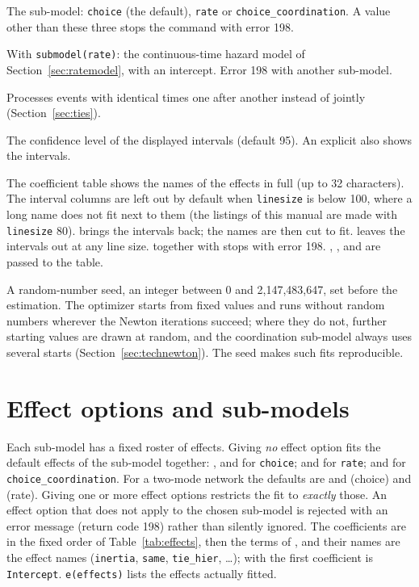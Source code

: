 \begin{description}[style=nextline,nosep]
  \item[\opt{submodel(string)}] The sub-model: \texttt{choice} (the default), \texttt{rate} or \texttt{choice\_coordination}. A value other than these three stops the command with error 198.
  \item[\opt{intercept}] With \texttt{submodel(rate)}: the continuous-time hazard model of Section~\ref{sec:ratemodel}, with an intercept. Error 198 with another sub-model.
  \item[\opt{sequential}] Processes events with identical times one after another instead of jointly (Section~\ref{sec:ties}).
  \item[\opt{level(\#)}] The confidence level of the displayed intervals (default 95). An explicit  also shows the intervals.
  \item[\opt{ci}, \opt{noci}] The coefficient table shows the names of the effects in full (up to 32 characters). The interval columns are left out by default when \texttt{linesize} is below 100, where a long name does not fit next to them (the listings of this manual are made with \texttt{linesize} 80).  brings the intervals back; the names are then cut to fit.  leaves the intervals out at any line size.  together with  stops with error 198. , ,  and  are passed to the table.
  \item[\opt{seed(\#)}] A random-number seed, an integer between 0 and 2{,}147{,}483{,}647, set before the estimation. The optimizer starts from fixed values and runs without random numbers wherever the Newton iterations succeed; where they do not, further starting values are drawn at random, and the coordination sub-model always uses several starts (Section~\ref{sec:technewton}). The seed makes such fits reproducible.
\end{description}

\section{Effect options and sub-models}\label{sec:defaults}

Each sub-model has a fixed roster of effects. Giving \emph{no} effect option fits the default effects of the sub-model together: ,  and  for \texttt{choice};  and  for \texttt{rate};  and  for \texttt{choice\_coordination}. For a two-mode network the defaults are  and  (choice) and  (rate). Giving one or more effect options restricts the fit to \emph{exactly} those. An effect option that does not apply to the chosen sub-model is rejected with an error message (return code 198) rather than silently ignored. The coefficients are in the fixed order of Table~\ref{tab:effects}, then the terms of , and their names are the effect names (\texttt{inertia}, \texttt{same}, \texttt{tie\_hier}, \ldots); with  the first coefficient is \texttt{Intercept}. \texttt{e(effects)} lists the effects actually fitted.

